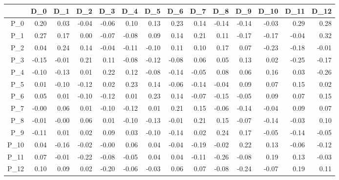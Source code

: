 \documentclass[10pt,a4paper]{article}\usepackage[]{graphicx}\usepackage[]{color}
\begin{document}
\begin{table}[ht]
\centering
\begin{tabular}{rrrrrrrrrrrrrr}
  \hline
 & D\_0 & D\_1 & D\_2 & D\_3 & D\_4 & D\_5 & D\_6 & D\_7 & D\_8 & D\_9 & D\_10 & D\_11 & D\_12 \\ 
  \hline
P\_0 & 0.20 & 0.03 & -0.04 & -0.06 & 0.10 & 0.13 & 0.23 & 0.14 & -0.14 & -0.14 & -0.03 & 0.29 & 0.28 \\ 
  P\_1 & 0.27 & 0.17 & 0.00 & -0.07 & -0.08 & 0.09 & 0.14 & 0.21 & 0.11 & -0.17 & -0.17 & -0.04 & 0.32 \\ 
  P\_2 & 0.04 & 0.24 & 0.14 & -0.04 & -0.11 & -0.10 & 0.11 & 0.10 & 0.17 & 0.07 & -0.23 & -0.18 & -0.01 \\ 
  P\_3 & -0.15 & -0.01 & 0.21 & 0.11 & -0.08 & -0.12 & -0.08 & 0.06 & 0.05 & 0.13 & 0.02 & -0.25 & -0.17 \\ 
  P\_4 & -0.10 & -0.13 & 0.01 & 0.22 & 0.12 & -0.08 & -0.14 & -0.05 & 0.08 & 0.06 & 0.16 & 0.03 & -0.26 \\ 
  P\_5 & 0.01 & -0.10 & -0.12 & 0.02 & 0.23 & 0.14 & -0.06 & -0.14 & -0.04 & 0.09 & 0.07 & 0.15 & 0.02 \\ 
  P\_6 & 0.05 & 0.01 & -0.10 & -0.12 & 0.01 & 0.23 & 0.14 & -0.07 & -0.15 & -0.05 & 0.09 & 0.07 & 0.15 \\ 
  P\_7 & -0.00 & 0.06 & 0.01 & -0.10 & -0.12 & 0.01 & 0.21 & 0.15 & -0.06 & -0.14 & -0.04 & 0.09 & 0.07 \\ 
  P\_8 & -0.01 & -0.00 & 0.06 & 0.01 & -0.10 & -0.13 & -0.01 & 0.21 & 0.15 & -0.07 & -0.14 & -0.03 & 0.10 \\ 
  P\_9 & -0.11 & 0.01 & 0.02 & 0.09 & 0.03 & -0.10 & -0.14 & 0.02 & 0.24 & 0.17 & -0.05 & -0.14 & -0.05 \\ 
  P\_10 & 0.04 & -0.16 & -0.02 & -0.00 & 0.06 & 0.04 & -0.04 & -0.19 & -0.02 & 0.22 & 0.13 & -0.06 & -0.12 \\ 
  P\_11 & 0.07 & -0.01 & -0.22 & -0.08 & -0.05 & 0.04 & 0.04 & -0.11 & -0.26 & -0.08 & 0.19 & 0.13 & -0.03 \\ 
  P\_12 & 0.10 & 0.09 & 0.02 & -0.20 & -0.06 & -0.03 & 0.06 & 0.07 & -0.08 & -0.24 & -0.07 & 0.19 & 0.11 \\ 
   \hline
\end{tabular}
\end{table}
\end{document}
